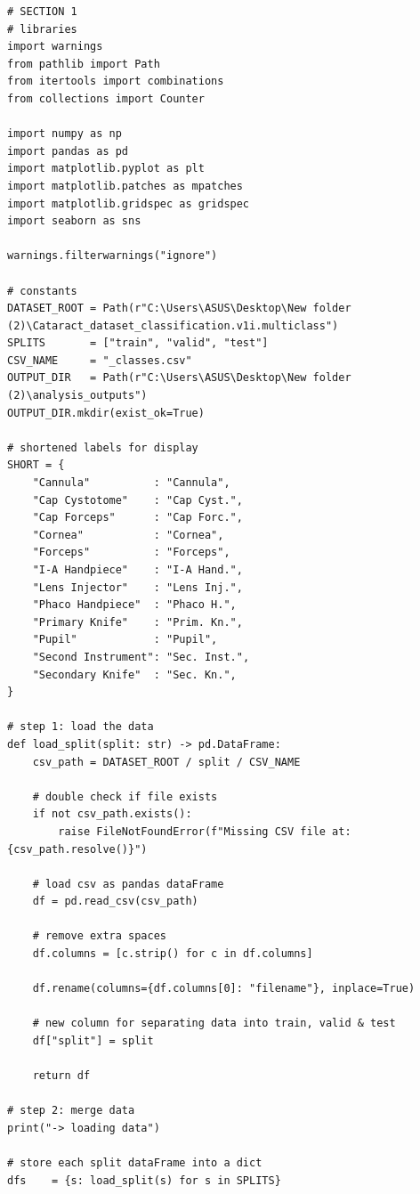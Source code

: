 \documentclass{article}
\begin{document}
\begin{latin}
\begin{LTR}
\begin{verbatim}
# SECTION 1
# libraries
import warnings
from pathlib import Path
from itertools import combinations
from collections import Counter

import numpy as np
import pandas as pd
import matplotlib.pyplot as plt
import matplotlib.patches as mpatches
import matplotlib.gridspec as gridspec
import seaborn as sns

warnings.filterwarnings("ignore")

# constants
DATASET_ROOT = Path(r"C:\Users\ASUS\Desktop\New folder (2)\Cataract_dataset_classification.v1i.multiclass")
SPLITS       = ["train", "valid", "test"]
CSV_NAME     = "_classes.csv"
OUTPUT_DIR   = Path(r"C:\Users\ASUS\Desktop\New folder (2)\analysis_outputs")
OUTPUT_DIR.mkdir(exist_ok=True)

# shortened labels for display
SHORT = {
    "Cannula"          : "Cannula",
    "Cap Cystotome"    : "Cap Cyst.",
    "Cap Forceps"      : "Cap Forc.",
    "Cornea"           : "Cornea",
    "Forceps"          : "Forceps",
    "I-A Handpiece"    : "I-A Hand.",
    "Lens Injector"    : "Lens Inj.",
    "Phaco Handpiece"  : "Phaco H.",
    "Primary Knife"    : "Prim. Kn.",
    "Pupil"            : "Pupil",
    "Second Instrument": "Sec. Inst.",
    "Secondary Knife"  : "Sec. Kn.",
}

# step 1: load the data 
def load_split(split: str) -> pd.DataFrame:
    csv_path = DATASET_ROOT / split / CSV_NAME
    
    # double check if file exists
    if not csv_path.exists():
        raise FileNotFoundError(f"Missing CSV file at: {csv_path.resolve()}")

    # load csv as pandas dataFrame    
    df = pd.read_csv(csv_path)

    # remove extra spaces 
    df.columns = [c.strip() for c in df.columns]

    df.rename(columns={df.columns[0]: "filename"}, inplace=True)

    # new column for separating data into train, valid & test
    df["split"] = split

    return df

# step 2: merge data
print("-> loading data")

# store each split dataFrame into a dict
dfs    = {s: load_split(s) for s in SPLITS}


\end{verbatim}
\end{LTR}
\end{latin}
\end{document}
